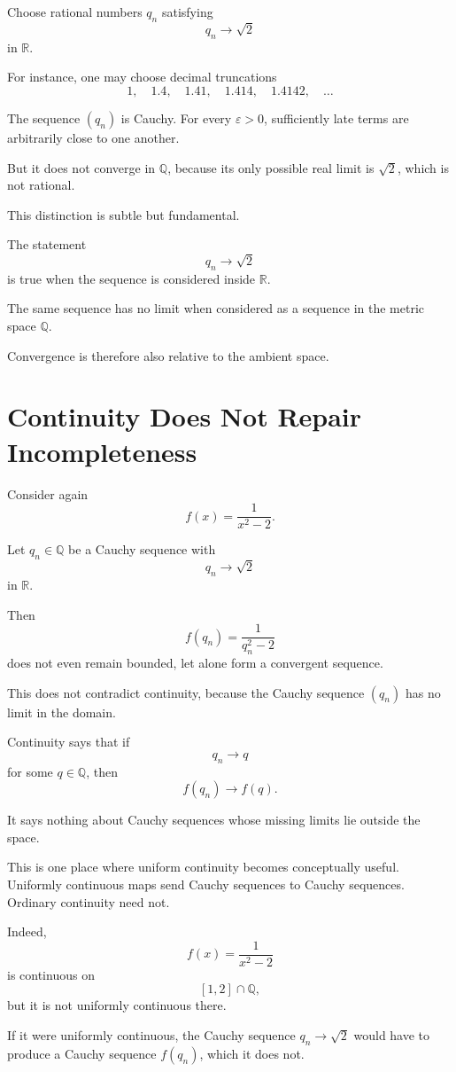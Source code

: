 \documentclass{essay}
\begin{document}
Choose rational numbers \(q_{n}\) satisfying
\[ q_{n}\to\sqrt{2} \]
in \(\mathbb{R}\).

For instance, one may choose decimal truncations
\[ 1,\quad 1.4,\quad 1.41,\quad 1.414,\quad 1.4142,\quad\ldots \]

The sequence \((q_{n})\) is Cauchy. For every \(\varepsilon>0\), sufficiently
late terms are arbitrarily close to one another.

But it does not converge in \(\mathbb{Q}\), because its only possible real
limit is \(\sqrt{2}\), which is not rational.

This distinction is subtle but fundamental.

The statement
\[ q_{n}\to\sqrt{2} \]
is true when the sequence is considered inside \(\mathbb{R}\).

The same sequence has no limit when considered as a sequence in the metric
space \(\mathbb{Q}\).

Convergence is therefore also relative to the ambient space.

\section{Continuity Does Not Repair Incompleteness}

Consider again
\[ f(x)=\frac{1}{x^{2}-2}. \]

Let \(q_{n}\in\mathbb{Q}\) be a Cauchy sequence with
\[ q_{n}\to\sqrt{2} \]
in \(\mathbb{R}\).

Then
\[ f(q_{n})=\frac{1}{q_{n}^{2}-2} \]
does not even remain bounded, let alone form a convergent sequence.

This does not contradict continuity, because the Cauchy sequence
\((q_{n})\) has no limit in the domain.

Continuity says that if
\[ q_{n}\to q \]
for some \(q\in\mathbb{Q}\), then
\[ f(q_{n})\to f(q). \]

It says nothing about Cauchy sequences whose missing limits lie outside the
space.

This is one place where uniform continuity becomes conceptually useful.
Uniformly continuous maps send Cauchy sequences to Cauchy sequences. Ordinary
continuity need not.

Indeed,
\[ f(x)=\frac{1}{x^{2}-2} \]
is continuous on
\[ [1,2]\cap\mathbb{Q}, \]
but it is not uniformly continuous there.

If it were uniformly continuous, the Cauchy sequence
\(q_{n}\to\sqrt{2}\) would have to produce a Cauchy sequence \(f(q_{n})\), which it
does not.
\end{document}
